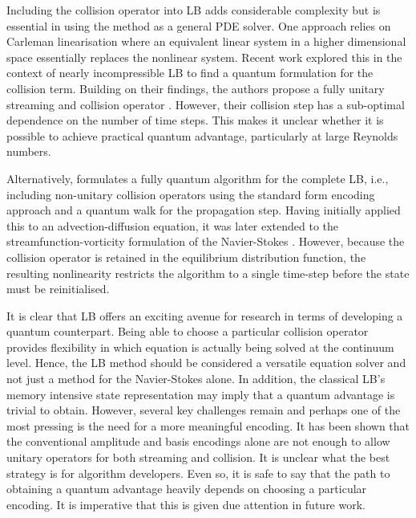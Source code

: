 \documentclass[10pt]{iopart}
\begin{document}
Including the collision operator into LB adds considerable complexity but is essential in using the method as a general PDE solver. One approach relies on Carleman linearisation where an equivalent linear system in a higher dimensional space essentially replaces the nonlinear system. 
Recent work \cite{itani2022analysis} explored this in the context of nearly incompressible LB to find a quantum formulation for the collision term. Building on their findings, the authors propose a fully unitary streaming and collision operator \cite{itani2023quantum}. However, their collision step has a sub-optimal dependence on the number of time steps. This makes it unclear whether it is possible to achieve practical quantum advantage, particularly at large Reynolds numbers. 

Alternatively, \citeauthor{Budinski2021} \cite{Budinski2021} formulates a fully quantum algorithm for the complete LB, i.e., including non-unitary collision operators using the standard form encoding approach \cite{low2019hamiltonian} and a quantum walk for the propagation step. Having initially applied this to an advection-diffusion equation, it was later extended to the streamfunction-vorticity formulation of the Navier-Stokes \cite{ljubomir2022quantum}. However, because the collision operator is retained in the equilibrium distribution function, the resulting nonlinearity restricts the algorithm to a single time-step before the state must be reinitialised. 

It is clear that LB offers an exciting avenue for research in terms of developing a quantum counterpart. Being able to choose a particular collision operator provides flexibility in which equation is actually being solved at the continuum level. Hence, the LB method should be considered a versatile equation solver and not just a method for the Navier-Stokes alone. 
In addition, the classical LB's memory intensive state representation may imply that a quantum advantage is trivial to obtain. However, several key challenges remain and perhaps one of the most pressing is the need for a more meaningful encoding. It has been shown \cite{schalkers2023importance} that the conventional amplitude and basis encodings alone are not enough to allow unitary operators for both streaming and collision. 
It is unclear what the best strategy is for algorithm developers. Even so, it is safe to say that the path to obtaining a quantum advantage heavily depends on choosing a particular encoding. It is imperative that this is given due attention in future work. 
\end{document}
